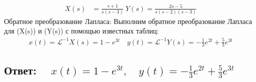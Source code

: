 \documentclass{article}
\begin{document}
        \begin{align*} X(s) & = \frac{s+1}{s(s-3)} \ Y(s)  = \frac{2s-5}{s(s-2)(s-3)} \end{align*} 
        Обратное преобразование Лапласа: Выполним обратное преобразование Лапласа для (X(s)) и (Y(s)) с помощью известных таблиц:  \begin{align*} x(t)  = \mathcal{L}^{-1}{X(s)} = 1 - e^{3t} \quad y(t)  = \mathcal{L}^{-1}{Y(s)} = -\frac{1}{3}e^{2t} + \frac{5}{3}e^{3t} \end{align*} 
        \subsection{Ответ: $\quad x(t) = 1 - e^{3t}, \quad y(t) = -\frac{1}{3}e^{2t} + \frac{5}{3}e^{3t}$ }


        
        
        
\end{document}
